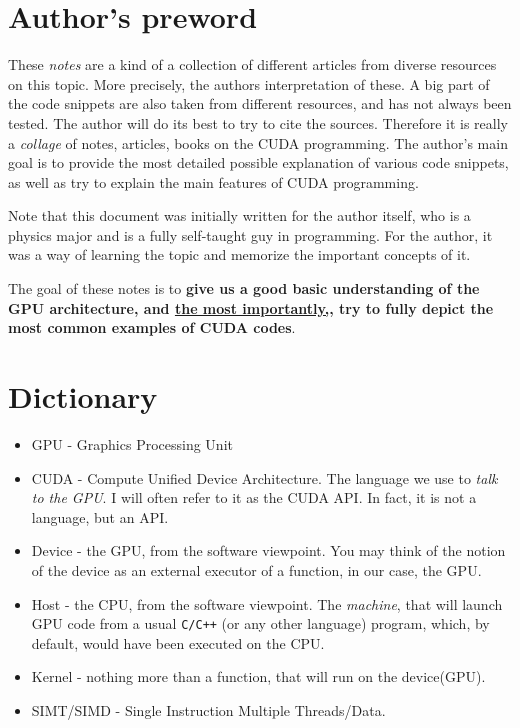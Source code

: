 
\section*{Author's preword}
\label{disclaimer}
These \textit{notes} are a kind of a collection of different articles from diverse resources on this topic. More precisely, the authors interpretation 
of these. A big part of the code snippets 
are also taken from different resources, 
and has not always been tested. The author will do its best to try to cite the sources. 
Therefore it is really a \textit{collage} of notes, articles, books on the CUDA programming.
The author's main goal is to provide the most detailed possible explanation of 
various code snippets, as well as try to explain the main features of CUDA programming.

Note that this document was initially written for the author itself, who is a physics major 
and is a fully self-taught guy in programming. 
For the author, it was a way of learning the topic and memorize 
the important concepts of it. 

The goal of these notes is to \textbf{give us a good basic understanding of the 
GPU architecture, and \underline{the most importantly,}, try to fully depict
the most common examples of CUDA codes}.

\section*{Dictionary}
\label{section:dictionary}
\begin{itemize}
   \setlength\itemsep{-0.5em}
   \item GPU - Graphics Processing Unit
   \item CUDA - Compute Unified Device Architecture. The language we use to \textit{talk to the GPU}. I will often refer to it as the CUDA API. In fact,
     it is not a language, but an API.
   \item Device - the GPU, from the software viewpoint. You may think of the notion of the 
   device as an external executor of a function, in our case, the GPU.
   \item Host - the CPU, from the software viewpoint. The \textit{machine}, that will launch GPU code from a
    usual \verb|C/C++| (or any other language) program, which, by default, would have been executed on the CPU.
   \item Kernel - nothing more than a function, that will run on the device(GPU).
   \item SIMT/SIMD - Single Instruction Multiple Threads/Data.
\end{itemize}



